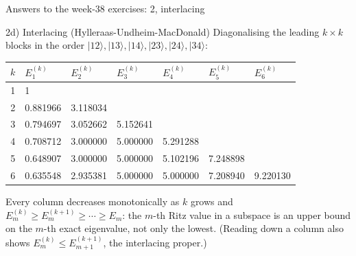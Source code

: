 \documentclass[aspectratio=169,10pt]{beamer}
\newcommand{\ket}[1]{\vert #1\rangle}
\begin{document}
\begin{frame}{Answers to the week-38 exercises: 2, interlacing}
  \footnotesize
  \begin{block}{2d) Interlacing (Hylleraas-Undheim-MacDonald)}
    Diagonalising the leading $k\times k$ blocks in the order $\ket{12},\ket{13},\ket{14},\ket{23},\ket{24},\ket{34}$:
    \begin{center}\scriptsize
    \begin{tabular}{r|llllll}
    $k$ & $E_1^{(k)}$ & $E_2^{(k)}$ & $E_3^{(k)}$ & $E_4^{(k)}$ & $E_5^{(k)}$ & $E_6^{(k)}$\\\hline
    1 & 1 &&&&&\\
    2 & 0.881966 & 3.118034 &&&&\\
    3 & 0.794697 & 3.052662 & 5.152641 &&&\\
    4 & 0.708712 & 3.000000 & 5.000000 & 5.291288 &&\\
    5 & 0.648907 & 3.000000 & 5.000000 & 5.102196 & 7.248898 &\\
    6 & 0.635548 & 2.935381 & 5.000000 & 5.000000 & 7.208940 & 9.220130
    \end{tabular}
    \end{center}
    Every column decreases monotonically as $k$ grows and $E_m^{(k)}\ge E_m^{(k+1)}\ge\cdots\ge E_m$: the $m$-th Ritz value in a subspace is an upper bound on the $m$-th exact eigenvalue, not only the lowest. (Reading down a column also shows $E_m^{(k)}\le E_{m+1}^{(k+1)}$, the interlacing proper.)
  \end{block}
\end{frame}
\end{document}
